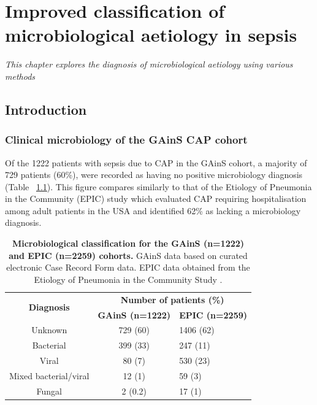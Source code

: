 \chapter{Improved classification of microbiological aetiology in sepsis}
\label{ch:Results2}
\textit{This chapter explores the diagnosis of microbiological aetiology using various methods}

\startcontents[chapters]{\vspace{-1.4cm}}
\singlespacing
{}
\doublespacing

\section{Introduction}
\subsection{Clinical microbiology of the GAinS CAP cohort}
Of the 1222 patients with sepsis due to CAP in the GAinS cohort, a majority of 729 patients (60\%), were recorded as having no positive microbiology diagnosis (Table ~\ref{tab:clinmicro}). This figure compares similarly to that of the Etiology of Pneumonia in the Community (EPIC) study \parencite{Jain2015} which evaluated CAP requiring hospitalisation among adult patients in the USA and identified 62\% as lacking a microbiology diagnosis. 

\FloatBarrier
\begin{table}[]
\begin{center}
\begin{tabular}{|c|c|l|}
\hline
\multirow{2}{*}{\textbf{Diagnosis}} & \multicolumn{2}{c|}{\textbf{Number of patients (\%)}} \\ \cline{2-3} 
                                    & \textbf{GAinS (n=1222)}    & \textbf{EPIC (n=2259)}   \\ \hline
Unknown                             & 729 (60)                   & 1406 (62)                \\ \hline
Bacterial                           & 399 (33)                   & 247 (11)                 \\ \hline
Viral                               & 80 (7)                     & 530 (23)                 \\ \hline
Mixed bacterial/viral               & 12 (1)                     & 59 (3)                   \\ \hline
Fungal                              & 2 (0.2)                    & 17 (1)                   \\ \hline
\end{tabular}
\end{center}
\smallskip
\caption[Clinical microbiology classification] {\textbf{Microbiological classification for the GAinS (n=1222) and EPIC (n=2259) cohorts.} GAinS data based on curated electronic Case Record Form data. EPIC data obtained from the Etiology of Pneumonia in the Community Study \parencite{Jain2015}.} 
\label{tab:clinmicro}
\end{table}

